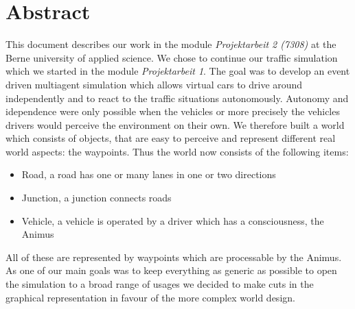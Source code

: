 
\section{Abstract}

This document describes our work in the module \emph{Projektarbeit 2 (7308)}
at the Berne university of applied science. We chose to continue our traffic simulation
 which we started in the module \emph{Projektarbeit 1}. The goal was to develop an event 
driven multiagent simulation which allows virtual cars to drive around independently and 
to react to the traffic situations autonomously. Autonomy and idependence were only 
possible when the vehicles or more precisely the vehicles drivers would perceive the 
environment on their own. We therefore built a world which consists of objects, that 
are easy to perceive and represent different real world aspects: the waypoints. Thus 
the world now consists of the following items:
\begin{itemize}
\item Road, a road has one or many lanes in one or two directions
\item Junction, a junction connects roads
\item Vehicle, a vehicle is operated by a driver which has a consciousness, the Animus
\end{itemize}
All of these are represented by waypoints which are processable by the Animus. 
As one of our main goals was to keep everything as generic as possible to open the 
simulation to a broad range of usages we decided to make cuts in the graphical 
representation in favour of the more complex world design.

